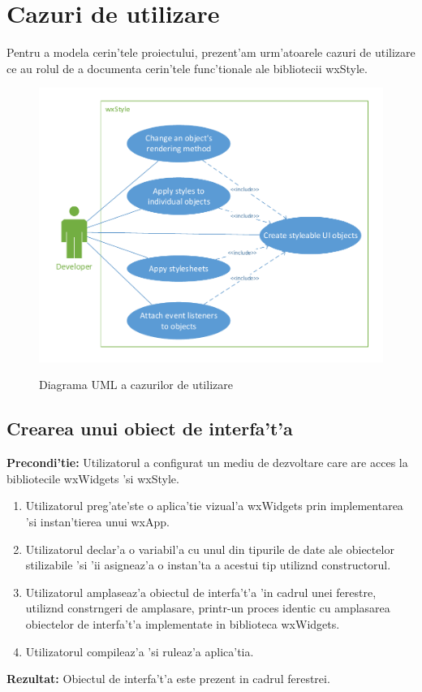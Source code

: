 \clearpage

\section{Cazuri de utilizare}

Pentru a modela cerin'tele proiectului, prezent'am urm'atoarele cazuri de utilizare ce au rolul de a documenta cerin'tele func'tionale ale bibliotecii wxStyle.

\begin{figure}[H]
	\centering 
	\includegraphics{img/use_case.pdf}
	\label{fig0402}
    \caption{Diagrama UML a cazurilor de utilizare}
\end{figure}



\subsection{Crearea unui obiect de interfa't'a}
\textbf{Precondi'tie:} Utilizatorul a configurat un mediu de dezvoltare care are acces la bibliotecile wxWidgets 'si wxStyle.
\begin{enumerate}
\item Utilizatorul preg'ate'ste o aplica'tie vizual'a wxWidgets prin implementarea 'si instan'tierea unui wxApp.
\item Utilizatorul declar'a o variabil'a cu unul din tipurile de date ale obiectelor stilizabile 'si 'ii asigneaz'a o instan'ta a acestui tip utiliz{\ia}nd constructorul.
\item Utilizatorul amplaseaz'a obiectul de interfa't'a 'in cadrul unei ferestre, utiliz{\ia}nd constr{\ia}ngeri de amplasare, printr-un proces identic cu amplasarea obiectelor de interfa't'a implementate in biblioteca wxWidgets.
\item Utilizatorul compileaz'a 'si ruleaz'a aplica'tia.
\end{enumerate}
\textbf{Rezultat:} Obiectul de interfa't'a este prezent in cadrul ferestrei.

